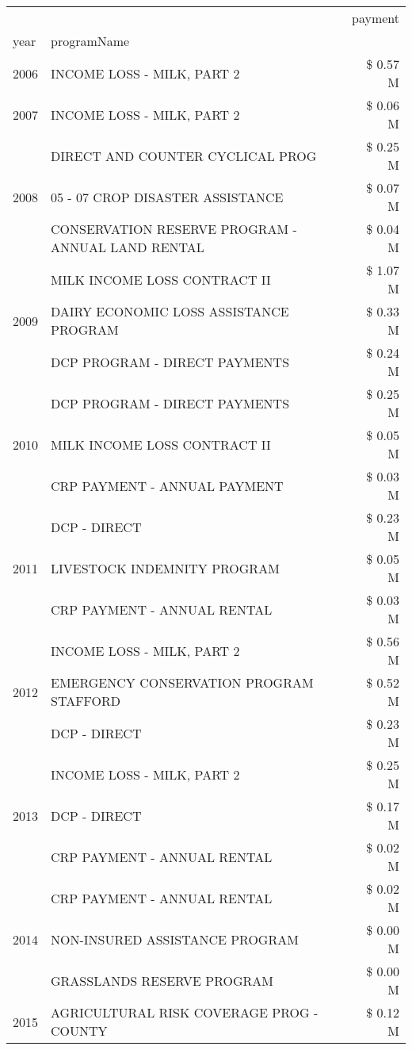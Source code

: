 \begin{tabular}{llr}
\toprule
 &  & payment \\
year & programName &  \\
\midrule
2006 & INCOME LOSS - MILK, PART 2 & \$ 0.57 M \\
\cline{1-3}
2007 & INCOME LOSS - MILK, PART 2 & \$ 0.06 M \\
\cline{1-3}
\multirow[t]{3}{*}{2008} & DIRECT AND COUNTER CYCLICAL PROG & \$ 0.25 M \\
 & 05 - 07 CROP DISASTER ASSISTANCE & \$ 0.07 M \\
 & CONSERVATION RESERVE PROGRAM - ANNUAL LAND RENTAL & \$ 0.04 M \\
\cline{1-3}
\multirow[t]{3}{*}{2009} & MILK INCOME LOSS CONTRACT II & \$ 1.07 M \\
 & DAIRY ECONOMIC LOSS ASSISTANCE PROGRAM & \$ 0.33 M \\
 & DCP PROGRAM - DIRECT PAYMENTS & \$ 0.24 M \\
\cline{1-3}
\multirow[t]{3}{*}{2010} & DCP PROGRAM - DIRECT PAYMENTS & \$ 0.25 M \\
 & MILK INCOME LOSS CONTRACT II & \$ 0.05 M \\
 & CRP PAYMENT - ANNUAL PAYMENT & \$ 0.03 M \\
\cline{1-3}
\multirow[t]{3}{*}{2011} & DCP - DIRECT & \$ 0.23 M \\
 & LIVESTOCK INDEMNITY PROGRAM & \$ 0.05 M \\
 & CRP PAYMENT - ANNUAL RENTAL & \$ 0.03 M \\
\cline{1-3}
\multirow[t]{3}{*}{2012} & INCOME LOSS - MILK, PART 2 & \$ 0.56 M \\
 & EMERGENCY CONSERVATION PROGRAM STAFFORD & \$ 0.52 M \\
 & DCP - DIRECT & \$ 0.23 M \\
\cline{1-3}
\multirow[t]{3}{*}{2013} & INCOME LOSS - MILK, PART 2 & \$ 0.25 M \\
 & DCP - DIRECT & \$ 0.17 M \\
 & CRP PAYMENT - ANNUAL RENTAL & \$ 0.02 M \\
\cline{1-3}
\multirow[t]{3}{*}{2014} & CRP PAYMENT - ANNUAL RENTAL & \$ 0.02 M \\
 & NON-INSURED ASSISTANCE PROGRAM & \$ 0.00 M \\
 & GRASSLANDS RESERVE PROGRAM & \$ 0.00 M \\
\cline{1-3}
\multirow[t]{3}{*}{2015} & AGRICULTURAL RISK COVERAGE PROG - COUNTY & \$ 0.12 M \\

\end{tabular}
